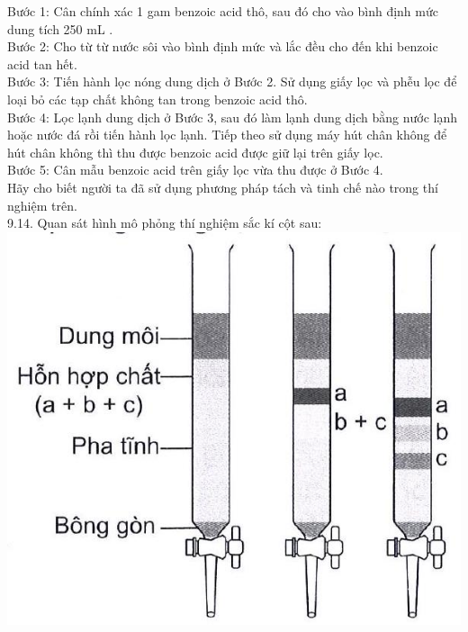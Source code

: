 \documentclass[10pt]{article}
\begin{document}
Bước 1: Cân chính xác 1 gam benzoic acid thô, sau đó cho vào bình định mức dung tích 250 mL .\\
Bước 2: Cho từ từ nước sôi vào bình định mức và lắc đều cho đến khi benzoic acid tan hết.\\
Bước 3: Tiến hành lọc nóng dung dịch ở Bước 2. Sử dụng giấy lọc và phễu lọc để loại bỏ các tạp chất không tan trong benzoic acid thô.\\
Bước 4: Lọc lạnh dung dịch ở Bước 3, sau đó làm lạnh dung dịch bằng nước lạnh hoặc nước đá rồi tiến hành lọc lạnh. Tiếp theo sử dụng máy hút chân không để hút chân không thì thu được benzoic acid được giữ lại trên giấy lọc.\\
Bước 5: Cân mẫu benzoic acid trên giấy lọc vừa thu được ở Bước 4.\\
Hãy cho biết người ta đã sử dụng phương pháp tách và tinh chế nào trong thí nghiệm trên.\\
9.14. Quan sát hình mô phỏng thí nghiệm sắc kí cột sau:\\
\includegraphics[max width=\textwidth, center]{2025_10_23_ae7aef68fb3b41082d29g-17}
\end{document}
